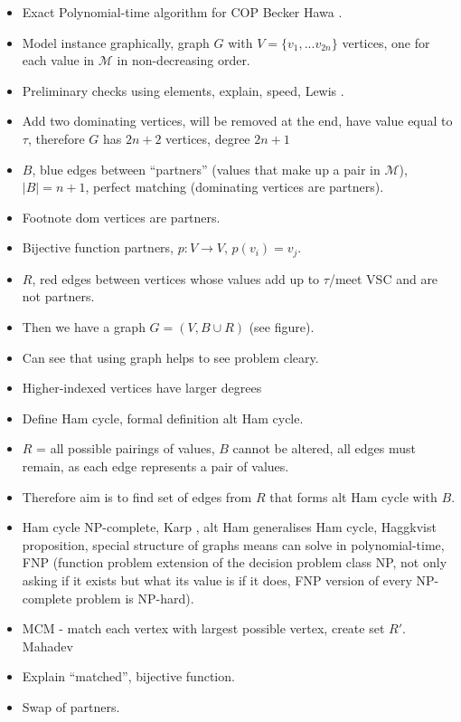 \documentclass{elsarticle}
\begin{document}
\begin{itemize}
	\item Exact Polynomial-time algorithm for COP Becker \cite{becker2015} Hawa \cite{hawa2018}.
	\item Model instance graphically, graph $G$ with $V = \{v_1, ...v_{2n}\}$ vertices, one for each value in $\mathcal{M}$ in non-decreasing order.
	\item Preliminary checks using elements, explain, speed, Lewis \cite{lewis2011}.
	\item Add two dominating vertices, will be removed at the end, have value equal to $\tau$, therefore $G$ has $2n+2$ vertices, degree $2n+1$
	\item $B$, blue edges between ``partners'' (values that make up a pair in $\mathcal{M}$), $|B| = n+1$, perfect matching (dominating vertices are partners).
	\item Footnote dom vertices are partners.
	\item Bijective function partners, $p : V \to V$, $p(v_i) = v_j$.
	\item $R$, red edges between vertices whose values add up to $\tau$/meet VSC and are not partners.
	\item Then we have a graph $G = (V, B \cup R)$ (see figure).
	\item Can see that using graph helps to see problem cleary.
	\item Higher-indexed vertices have larger degrees
	\item Define Ham cycle, formal definition alt Ham cycle.
	\item $R$ = all possible pairings of values, $B$ cannot be altered, all edges must remain, as each edge represents a pair of values.
	\item Therefore aim is to find set of edges from $R$ that forms alt Ham cycle with $B$.
	\item Ham cycle NP-complete, Karp \cite{karp1972}, alt Ham generalises Ham cycle, Haggkvist \cite{haggkvist1977} proposition, special structure of graphs means can solve in polynomial-time, FNP (function problem extension of the decision problem class NP, not only asking if it exists but what its value is if it does, FNP version of every NP-complete problem is NP-hard).
	\item MCM - match each vertex with largest possible vertex, create set $R'$. Mahadev \cite{mahadev1994}
	\item Explain ``matched'', bijective function.
	\item Swap of partners.

\end{itemize}
\end{document}
